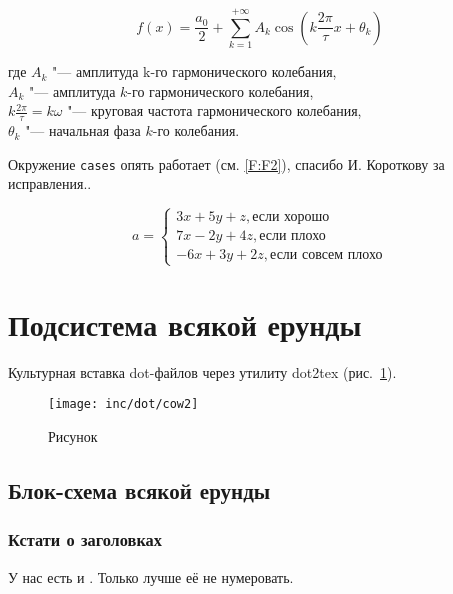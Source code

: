 \begin{eqndesc}
    \begin{equation}\label{eq:fourierrow}
        f(x) = \frac{a_0}{2} + \sum\limits_{k=1}^{+\infty} A_k\cos\left(k\frac{2\pi}{\tau}x+\theta_k\right)
    \end{equation}

    где $A_k$ "--- амплитуда  k-го гармонического колебания,\\
    $A_k$ "--- амплитуда $k$-го гармонического колебания,\\
    $ k\frac{2\pi}{\tau} = k\omega$ "--- круговая частота гармонического колебания,\\
    $\theta_k$ "--- начальная фаза $k$-го колебания.
\end{eqndesc}


Окружение \texttt{cases} опять работает (см. \eqref{F:F2}), спасибо И. Короткову за исправления..


\begin{equation}
a= \begin{cases}
 3x + 5y + z, \mbox{если хорошо} \\
 7x - 2y + 4z, \mbox{если плохо}\\
 -6x + 3y + 2z, \mbox{если совсем плохо}
\end{cases}
\label{F:F2}
\end{equation}

\section{Подсистема всякой ерунды}

Культурная вставка dot-файлов через утилиту dot2tex (рис.~\ref{fig:fig02}).

\begin{figure}
  \centering
  \texttt{[image: inc/dot/cow2]}
  \caption{Рисунок}
  \label{fig:fig02}
\end{figure}


\subsection{Блок-схема всякой ерунды}

\subsubsection*{Кстати о заголовках}

У нас есть и . Только лучше её не нумеровать.

